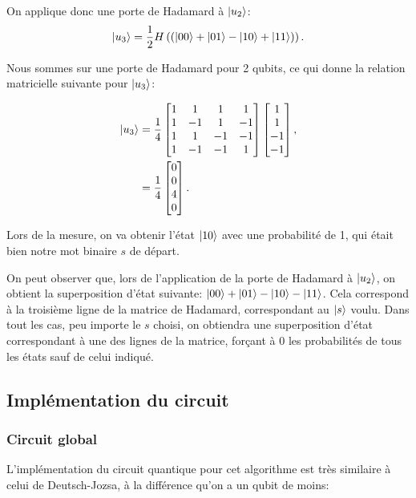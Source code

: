 On applique donc une porte de Hadamard à $\ket{u_2}$:
\begin{equation}
  \label{eq:5}
\ket{u_3} = \frac{1}{2} H \left( (\ket{00} + \ket{01} - \ket{10} + \ket{11}) \right) .
\end{equation}

Nous sommes sur une porte de Hadamard pour 2 qubits, ce qui donne
la relation matricielle suivante pour $\ket{u_3}$:

\begin{align}
\ket{u_3} &=
\frac{1}{4} 
\begin{bmatrix}
  1 & 1 & 1 & 1 \\
  1 & -1 & 1 & -1 \\
  1 & 1 & -1 & -1 \\
  1 & -1 & -1 & 1 \\
\end{bmatrix}
\begin{bmatrix}
  1 \\ 1 \\ -1 \\ -1
\end{bmatrix} \nonumber , \\ 
 &= \frac{1}{4} 
\begin{bmatrix}
  0 \\
  0 \\
  4 \\
  0 \\
\end{bmatrix}.
\end{align}

Lors de la mesure, on va obtenir l'état $\ket{10}$ avec une probabilité de 1, qui était bien notre mot binaire $s$ de départ.

On peut observer que, lors de l'application de la porte de Hadamard à $\ket{u_2}$, on obtient la superposition d'état suivante: $\ket{00} + \ket{01} - \ket{10} - \ket{11}$. Cela correspond à la troisième ligne de la matrice de Hadamard, correspondant au $\ket{s}$ voulu. Dans tout les cas, peu importe le $s$ choisi, on obtiendra une superposition d'état correspondant à une des lignes de la matrice, forçant à 0 les probabilités de tous les états sauf de celui indiqué.

\subsection{Implémentation du circuit}

\subsubsection*{Circuit global}
L'implémentation du circuit quantique pour cet algorithme est très similaire à celui de Deutsch-Jozsa, à la différence qu'on a un qubit de moins:

